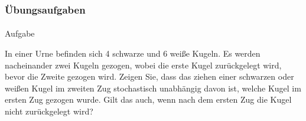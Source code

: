 \documentclass{beamer}
\begin{document}
\begin{frame}
    \frametitle{Übungsaufgaben}
\framesubtitle{}
\begin{block}{Aufgabe}

In einer Urne befinden sich 4 schwarze und 6 weiße Kugeln.
Es werden nacheinander zwei Kugeln gezogen, wobei die erste Kugel zurückgelegt wird, bevor die Zweite gezogen wird.
Zeigen Sie, dass das ziehen einer schwarzen oder weißen Kugel im zweiten Zug stochastisch unabhängig davon ist, welche Kugel im ersten Zug gezogen wurde.
Gilt das auch, wenn nach dem ersten Zug die Kugel nicht zurückgelegt wird?


\end{block}
 \end{frame}
\end{document}
